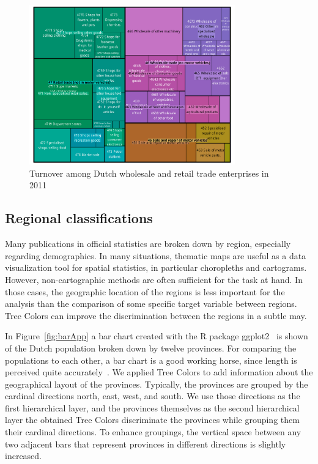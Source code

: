 \documentclass[review,journal]{vgtc}         %
\begin{document}
\begin{figure}[!t]
  \centering
  \includegraphics[width=3.5in]{TMbusiness.pdf}
  \caption{Turnover among Dutch wholesale and retail trade enterprises in 2011}\label{fig:treemapApp}
\end{figure}

\subsection{Regional classifications}
Many publications in official statistics are broken down by region, especially regarding demographics.
In many situations, thematic maps are useful as a data visualization tool for spatial statistics, in particular choropleths and cartograms. However, non-cartographic methods are often sufficient for the task at hand. In those cases, the geographic location of the regions is less important for the analysis than the comparison of some specific target variable between regions. Tree Colors can improve the discrimination between the regions in a subtle may.

In Figure~\ref{fig:barApp} a bar chart created with the R package ggplot2~\cite{ggplot2} is shown of the Dutch population broken down by twelve provinces. For comparing the populations to each other, a bar chart is a good working horse, since length is perceived quite accurately~\cite{Mackinlay1986}. We applied Tree Colors to add information about the geographical layout of the provinces. Typically, the provinces are grouped by the cardinal directions north, east, west, and south. We use those directions as the first hierarchical layer, and the provinces themselves as the second hierarchical layer the obtained Tree Colors discriminate the provinces while grouping them their cardinal directions. To enhance groupings, the vertical space between any two adjacent bars that represent provinces in different directions is slightly increased.
\end{document}

